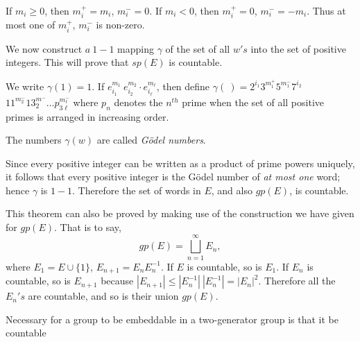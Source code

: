 If $m_i \geq 0$, then $m^+_i = m_i$, $m^{-}_i = 0$. If $m_i < 0$, then
$m^+ _i = 0$, $m^{-}_i = -m_i$. Thus at most one of $m^+_i$, $m^-_i$
is non-zero. 

We now construct $a ~ 1-1$ mapping $\gamma$ of the set of all $w' s$
into the set of positive integers. This will prove that $sp(E)$ is
countable. 

We write $\gamma (1) = 1$. If $e^{m_1}_{i_1} ~ e^{m_2}_{i_2} \cdot
e^{m_\ell}_{i_\ell}$, then define $\gamma (~) = 2^{i_1} 3^{m^+_1}
5^{m^-_1} 7^{i_2}$ $11^{m^{-}_2} 13^{m^-}_2 \ldots p^{m^-_\ell}_{3\ell}$
where $p_n$ denotes the $n^{th}$ prime when the set of all positive
primes is arranged in increasing order. 

The numbers $\gamma (w)$ are called \textit{G\"{o}del numbers}. 

Since every positive integer can be written as a product of prime
powers uniquely, it follows that every positive integer is the
G\"{o}del number of \textit{at most one} word; hence $\gamma$ is
$1-1$. Therefore the set of words in $E$, and also $gp(E)$, is
countable. 

\begin{remark}
  This theorem can also be proved by making use of the construction we
  have given for $gp(E)$. That is to say, 
  $$
  gp(E) = \bigsqcup_{n=1}^\infty E_n,
  $$
  where $E_1 = E \cup \{ 1 \}$, $E_{n+1} = E_n E_{n}^{-1}$. If $E$ is
  countable, so is $E_1$. If $E_n$ is countable, so is $E_{n+1}$
  because $| E_{n+1}| \leq | E_n^{-1} | ~ | E_n^{-1}| = | E_n
  |^2$. Therefore all the $E_n's$ are countable, and so is their union
  $gp(E)$. 
\end{remark}

\begin{corollary}
  Necessary for a group to be embeddable in a two-generator group is
  that it be countable 
\end{corollary}

\section{}%

